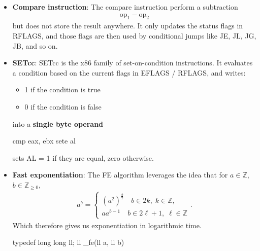 \documentclass{report}
\begin{document}
\begin{itemize}
\begin{cppcode}
            INST   r8,r9
            \end{cppcode}
            \bigbreak \noindent 
            could use INSTs r32 variant, with a REX prefix and REX.W = 0, which is effectively the same as
            \bigbreak \noindent 
            \begin{cppcode}
            INST   r8d, r9d
            \end{cppcode}
            \bigbreak \noindent 
            assuming we want our operands to be 32-bit.
        \item \textbf{Compare instruction}: The compare instruction perform a subtraction
            \begin{align*}
                \text{op}_{1} - \text{op}_{2}
            \end{align*}
            but does not store the result anywhere. It only updates the status flags in RFLAGS, and those flags are then used by conditional jumps like JE, JL, JG, JB, and so on.
        \item \textbf{SETcc}: SETcc is the x86 family of set-on-condition instructions. It evaluates a condition based on the current flags in EFLAGS / RFLAGS, and writes:
            \begin{itemize}
                \item 1 if the condition is true
                \item 0 if the condition is false
            \end{itemize}
            into a \textbf{single byte operand}
            \bigbreak \noindent 
            \begin{cppcode}
                cmp eax, ebx
                sete al
            \end{cppcode}
            sets AL = 1 if they are equal, zero otherwise.
        \item \textbf{Fast exponentiation}: The FE algorithm leverages the idea that  for $a\in \mathbb{Z}$, $b \in \mathbb{Z}_{ \geq 0}$,
            \begin{align*}
                a^{b} = \begin{cases}
                        (a^{2})^{\frac{b}{2}} \quad b \in 2k,\; k\in \mathbb{Z}, \\
                        aa^{b-1} \quad b \in 2\ell + 1,\; \ell \in \mathbb{Z}
                \end{cases}
            .\end{align*}
            Which therefore gives us exponentiation in logarithmic time.
            \bigbreak \noindent 
            \begin{cppcode}
                typedef long long ll;
                ll _fe(ll a, ll b) {

}
\end{cppcode}
\end{itemize}
\end{document}
